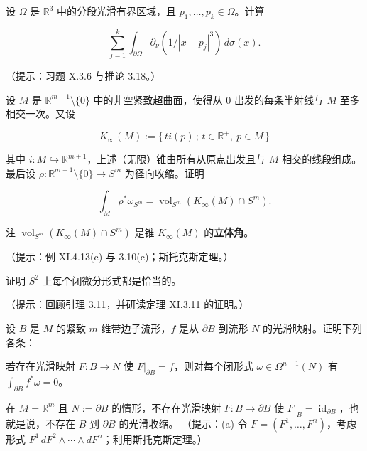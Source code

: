 \begin{exercises}
\item

设 $ \Omega $ 是 $ \mathbb{R}^3 $ 中的分段光滑有界区域，且 $ p_1,\ldots,p_k \in \Omega $。计算

\[
\sum_{j=1}^{k}\int_{\partial\Omega}\partial_\nu (1/|x-p_j|^3)\,d\sigma(x).
\]

（提示：习题 X.3.6 与推论 3.18。）

\item

设 $ M $ 是 $ \mathbb{R}^{m+1}\setminus\{0\} $ 中的非空紧致超曲面，使得从 $ 0 $ 出发的每条半射线与 $ M $ 至多相交一次。又设

\[
K_\infty(M) := \{\,ti(p)\,;\,t \in \mathbb{R}^+,\ p \in M\,\}
\]

其中 $ i: M \hookrightarrow \mathbb{R}^{m+1} $，上述（无限）锥由所有从原点出发且与 $ M $ 相交的线段组成。最后设 $ \rho: \mathbb{R}^{m+1}\setminus\{0\} \to S^m $ 为径向收缩。证明

\[
\int_M \rho^*\omega_{S^m} = \operatorname{vol}_{S^m}(K_\infty(M)\cap S^m).
\]

注 $ \operatorname{vol}_{S^m}(K_\infty(M)\cap S^m) $ 是锥 $ K_\infty(M) $ 的\textbf{立体角}。

（提示：例 XI.4.13(c) 与 3.10(c)；斯托克斯定理。）

\item

证明 $ S^2 $ 上每个闭微分形式都是恰当的。

（提示：回顾引理 3.11，并研读定理 XI.3.11 的证明。）

\item

设 $ B $ 是 $ M $ 的紧致 $ m $ 维带边子流形，$ f $ 是从 $ \partial B $ 到流形 $ N $ 的光滑映射。证明下列各条：

\begin{items}
\item

若存在光滑映射 $ F: B \to N $ 使 $ F|_{\partial B} = f $，则对每个闭形式 $ \omega \in \Omega^{n-1}(N) $ 有 $ \int_{\partial B} f^*\omega = 0 $。

\item

在 $ M = \mathbb{R}^m $ 且 $ N := \partial B $ 的情形，不存在光滑映射 $ F: B \to \partial B $ 使 $ F|_B = \operatorname{id}_{\partial B} $，也就是说，不存在 $ B $ 到 $ \partial B $ 的光滑收缩。
（提示：(a) 令 $ F = (F^1,\ldots,F^n) $，考虑形式 $ F^1\,dF^2\wedge\cdots\wedge dF^n $；利用斯托克斯定理。）


\end{items}
\end{exercises}
